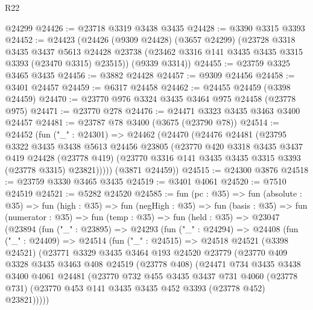 \begin{lexlean}{R22}
\begin{coremodule}
    @24299
@24426 := @23718 @3319 @3438 @3435
@24428 := @3390 @3315 @3393
@24452 := @24423
    (@24426
      (@9309 @24428)
      (@3657 @24299)
      (@23728
        @3318
        @3435
        @3437
        @5613
        @24428
        @23738
        (@23462 @3316 @141 @3435 @3435 @3315 @3393 (@23470 @3315) @23515))
      (@9339 @3314))
@24455 := @23759 @3325 @3465 @3435
@24456 := @3882 @24428
@24457 := @9309 @24456
@24458 := @3401 @24457
@24459 := @6317 @24458
@24462 := @24455 @24459 (@3398 @24459)
@24470 := @23770 @976 @3324 @3435 @3464 @975 @24458 (@23778 @975)
@24471 := @23770 @278
@24476 := @24471 @3323 @3435 @3463 @3400 @24457
@24481 := @23787 @78 @3400 (@3675 (@23790 @78))
@24514 := @24452
    (fun ("_" : @24301) =>
    @24462
      (@24470
        (@24476
          @24481
          (@23795
            @3322
            @3435
            @3438
            @5613
            @24456
            @23805
            (@23770
              @420
              @3318
              @3435
              @3437
              @419
              @24428
              (@23778 @419)
              (@23770 @3316 @141 @3435 @3435 @3315 @3393 (@23778 @3315) @23821)))))
      (@3871 @24459))
@24515 := @24300 @3876
@24518 := @23759 @3330 @3465 @3435
@24519 := @3401 @4061
@24520 := @7510 @24519
@24521 := @5282 @24520
@24585 := fun (pc : @35) =>
  fun (absolute : @35) =>
  fun (high : @35) =>
  fun (negHigh : @35) =>
  fun (basis : @35) =>
  fun (numerator : @35) =>
  fun (temp : @35) =>
  fun (held : @35) =>
  @23047
    (@23894
      (fun ("_" : @23895) =>
      @24293
        (fun ("_" : @24294) =>
        @24408
          (fun ("_" : @24409) =>
          @24514
            (fun ("_" : @24515) =>
            @24518
              @24521
              (@3398 @24521)
              (@23771
                @3329
                @3435
                @3464
                @193
                @24520
                @23779
                (@23770
                  @409
                  @3328
                  @3435
                  @3463
                  @408
                  @24519
                  (@23778 @408)
                  (@24471
                    @734
                    @3435
                    @3438
                    @3400
                    @4061
                    @24481
                    (@23770
                      @732
                      @455
                      @3435
                      @3437
                      @731
                      @4060
                      (@23778 @731)
                      (@23770 @453 @141 @3435 @3435 @452 @3393 (@23778 @452) @23821)))))

\end{coremodule}
\end{lexlean}
